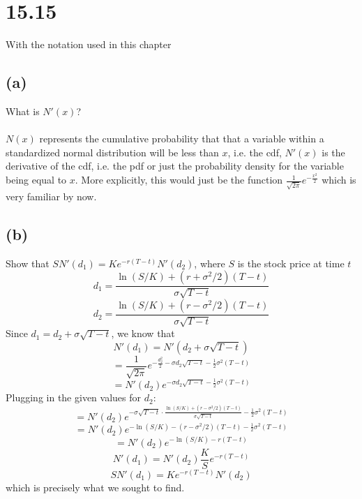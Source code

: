 \documentclass{article}
\begin{document}
{\Large 

\section*{15.15}
With the notation used in this chapter

\subsection*{(a)}
What is \(N'(x)\)? \\ \\
\(N(x)\) represents the cumulative probability that that a variable within a standardized normal distribution will be less than \(x\), i.e. the cdf, \(N'(x)\) is the derivative of the cdf, i.e. the pdf or just the probability density for the variable being equal to \(x\). More explicitly, this would just be the function \(\frac{1}{\sqrt{2\pi}} e^{-\frac{x^2}{2}}\) which is very familiar by now. 

\subsection*{(b)}
Show that \(SN'(d_1) = Ke^{-r(T-t)}N'(d_2)\), where \(S\) is the stock price at time \(t\) 
\[
  d_1 = \frac{\ln(S / K) + (r + \sigma^2 / 2)(T - t)}{\sigma \sqrt{T - t}}
\]
\[
  d_2 = \frac{\ln(S / K) + (r - \sigma^2 / 2)(T - t)}{\sigma \sqrt{T - t}}
\]
Since \(d_1 = d_2 + \sigma \sqrt{T - t}\), we know that 
\[
  N'(d_1) = N'(d_2 + \sigma \sqrt{T-t})
\]
\[
  = \frac{1}{\sqrt{2\pi}} e^{-\frac{d_2^2}{2} - \sigma d_2 \sqrt{T-t} - \frac{1}{2} \sigma^2 (T-t)}
\]
\[
  = N'(d_2) e^{ - \sigma d_2 \sqrt{T-t} - \frac{1}{2} \sigma^2 (T-t)}
\]
Plugging in the given values for \(d_2\):
\[
  = N'(d_2) e^{ - \sigma \sqrt{T-t} \cdot \frac{\ln(S / K) + (r - \sigma^2 / 2)(T - t)}{\sigma \sqrt{T - t}}  - \frac{1}{2} \sigma^2 (T-t)}
\]
\[
  = N'(d_2) e^{ - \ln(S / K) - (r - \sigma^2 / 2)(T - t) - \frac{1}{2} \sigma^2 (T-t)}
\]
\[
  = N'(d_2) e^{ - \ln(S / K) - r(T - t)}
\]
\[
  N'(d_1) = N'(d_2) \frac{K}{S}e^{-r(T - t)} 
\]
\[
  S N'(d_1) = Ke^{-r(T - t)} N'(d_2)
\]
which is precisely what we sought to find. 

}
\end{document}
